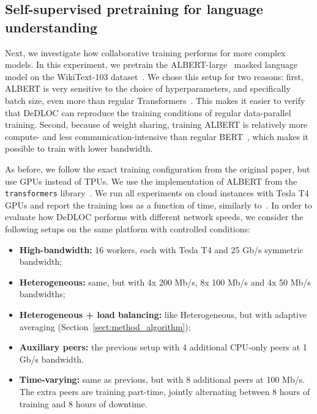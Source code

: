 \subsection{Self-supervised pretraining for language understanding}
\label{sect:exp_albert}

Next, we investigate how collaborative training performs for more complex models. In this experiment, we pretrain the ALBERT-large~\cite{albert} masked language model on the WikiText-103 dataset~\cite{wikitext103}. We chose this setup for two reasons: first, ALBERT is very sensitive to the choice of hyperparameters, and specifically batch size, even more than regular Transformers~\cite{trainingtips}. This makes it easier to verify that DeDLOC can reproduce the training conditions of regular data-parallel training. Second, because of weight sharing, training ALBERT is relatively more compute- and less communication-intensive than regular BERT~\cite{bert}, which makes it possible to train with lower bandwidth.
\nocite{paszke2019pytorch}

As before, we follow the exact training configuration from the original paper, but use GPUs instead of TPUs. We use the implementation of ALBERT from the \texttt{transformers} library~\cite{wolf-etal-2020-transformers}. We run all experiments on cloud instances with Tesla T4 GPUs and report the training loss as a function of time, similarly to~\cite{lin2020multinode,switch}. In order to evaluate how DeDLOC performs with different network speeds, we consider the following setups on the same platform with controlled conditions:
\begin{itemize}[leftmargin=*]
   \item \textbf{High-bandwidth:} 16 workers, each with Tesla T4 and 25 Gb/s symmetric bandwidth;
    \item \textbf{Heterogeneous:} same, but with 4x 200 Mb/s, 8x 100 Mb/s and 4x 50 Mb/s bandwidths;
    \item \textbf{Heterogeneous + load balancing:} like Heterogeneous, but with adaptive averaging (Section~\ref{sect:method_algorithm});
    \item \textbf{Auxiliary peers:} the previous setup with 4 additional CPU-only peers at 1 Gb/s bandwidth.
    \item \textbf{Time-varying:} same as previous, but with 8 additional peers at 100 Mb/s. The extra peers are training part-time, jointly alternating between 8 hours of training and 8 hours of downtime.
\end{itemize}
\pagebreak[0]

